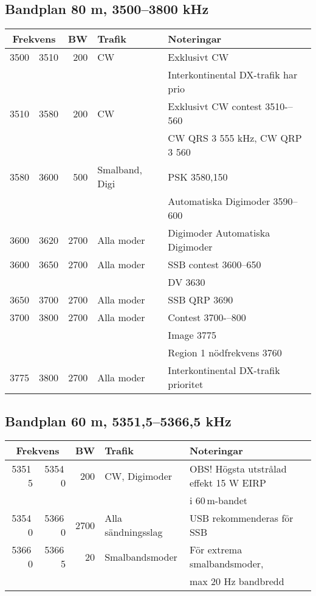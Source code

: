 \subsection{Bandplan 80 m, 3500--3800 kHz}
\begin{tabular}{rrrll}
\multicolumn{2}{c}{\textbf{Frekvens}} & \textbf{BW} & \textbf{Trafik} & \textbf{Noteringar} \\ \hline
3500 & 3510 & 200  & CW             & Exklusivt CW                         \\
      &       &      &                & Interkontinental DX-trafik har prio  \\ \hline
3510 & 3580 & 200  & CW             & Exklusivt CW contest 3510-–560       \\
      &       &      &                & CW QRS 3 555 kHz, CW QRP 3 560       \\ \hline
3580 & 3600 & 500  & Smalband, Digi & PSK 3580,150                        \\
      &       &      &                & Automatiska Digimoder 3590--600     \\ \hline
3600 & 3620 & 2700 & Alla moder     & Digimoder Automatiska Digimoder      \\ \hline
3600 & 3650 & 2700 & Alla moder     & SSB contest 3600--650               \\
      &       &      &                & DV 3630                             \\ \hline
3650 & 3700 & 2700 & Alla moder     & SSB QRP 3690                        \\ \hline
3700 & 3800 & 2700 & Alla moder     & Contest 3700-–800                   \\
      &       &      &                & Image 3775                          \\
      &       &      &                & Region 1 nödfrekvens 3760           \\ \hline
3775 & 3800 & 2700 & Alla moder     & Interkontinental DX-trafik prioritet \\ \hline
\end{tabular}


\subsection{Bandplan 60 m, 5351,5--5366,5 kHz}
\begin{tabular}{rrrll}
\multicolumn{2}{c}{\textbf{Frekvens}} & \textbf{BW} & \textbf{Trafik} & \textbf{Noteringar} \\ \hline
5351\,5 & 5354\,0 &  200 & CW, Digimoder      & OBS! Högsta utstrålad effekt 15 W EIRP\\
        &         &      &                    & i 60\,m-bandet\\ \hline
5354\,0 & 5366\,0 & 2700 & Alla sändningsslag & USB rekommenderas för SSB\\ \hline
5366\,0 & 5366\,5 &   20 & Smalbandsmoder     & För extrema smalbandsmoder,\\
        &         &      &                    & max 20 Hz bandbredd\\ \hline
\end{tabular}


